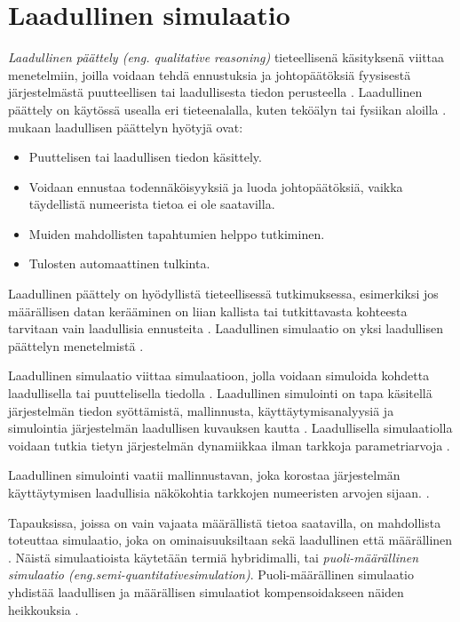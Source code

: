 \documentclass[utf8]{gradu3}
\begin{document}
\section{Laadullinen simulaatio} \label{laadullinen simulaatio}
\textit{Laadullinen päättely (eng. qualitative reasoning)} 
tieteellisenä käsityksenä viittaa menetelmiin, joilla
voidaan tehdä ennustuksia ja johtopäätöksiä fyysisestä järjestelmästä puutteellisen tai laadullisesta tiedon perusteella
\parencite{QualitativeReasoning1997}. 
Laadullinen päättely on käytössä usealla eri tieteenalalla, kuten teköälyn \parencite[luku~35]{qualitativeReasoning2014} tai fysiikan aloilla \parencite{QualitativePhysics1988}.
\textcite{QualitativeReasoning1997} mukaan laadullisen päättelyn hyötyjä ovat:
\begin{itemize}
    \item Puuttelisen tai laadullisen tiedon käsittely.
    \item Voidaan ennustaa todennäköisyyksiä ja luoda johtopäätöksiä, 
    vaikka täydellistä numeerista tietoa ei ole saatavilla.
    \item Muiden mahdollisten tapahtumien helppo tutkiminen.
    \item Tulosten automaattinen tulkinta. 
\end{itemize}
Laadullinen päättely on hyödyllistä tieteellisessä tutkimuksessa, esimerkiksi jos 
määrällisen datan kerääminen on liian kallista tai 
tutkittavasta kohteesta tarvitaan vain laadullisia ennusteita
\parencite{QualitativeReasoning1997}.
Laadullinen simulaatio on yksi laadullisen päättelyn menetelmistä \parencite{kuipers1986qualitative}. 

Laadullinen simulaatio viittaa simulaatioon, jolla voidaan simuloida kohdetta
laadullisella tai puuttelisella tiedolla \parencite{kuipers1986qualitative}.
Laadullinen simulointi on tapa käsitellä järjestelmän tiedon syöttämistä, 
mallinnusta, käyttäytymisanalyysiä ja simulointia järjestelmän 
laadullisen kuvauksen kautta \parencite{QualSimTheoryApplications2013}.
Laadullisella simulaatiolla voidaan tutkia tietyn järjestelmän dynamiikkaa 
ilman tarkkoja parametriarvoja \parencite{cosme2023history}. 

Laadullinen simulointi vaatii mallinnustavan, 
joka korostaa järjestelmän käyttäytymisen laadullisia näkökohtia 
tarkkojen numeeristen arvojen sijaan. 
%
\parencites%
  {parallelQualitativeSimulation1997}%
  {kuipers1986qualitative}%
\relax.
%

Tapauksissa, joissa on vain vajaata määrällistä tietoa saatavilla,
on mahdollista toteuttaa simulaatio, 
joka on ominaisuuksiltaan sekä laadullinen että määrällinen 
\parencite{semiHybrid1997qualitative}. 
Näistä simulaatioista käytetään termiä hybridimalli, tai
\textit{ puoli-määrällinen simulaatio 
(eng.semi-quantitativesimulation)}. 
Puoli-määrällinen simulaatio yhdistää laadullisen ja määrällisen simulaatiot
kompensoidakseen näiden heikkouksia \parencite{semiHybrid1997qualitative}.
\end{document}
